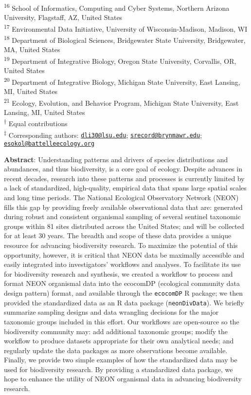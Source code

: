 \documentclass[
  12pt,
]{article}
\begin{document}
\textsuperscript{16} School of Informatics, Computing and Cyber Systems, Northern Arizona University, Flagstaff, AZ, United States\\
\textsuperscript{17} Environmental Data Initiative, University of Wisconsin-Madison, Madison, WI\\
\textsuperscript{18} Department of Biological Sciences, Bridgewater State University, Bridgewater, MA, United States\\
\textsuperscript{19} Department of Integrative Biology, Oregon State University, Corvallis, OR, United States\\
\textsuperscript{20} Department of Integrative Biology, Michigan State University, East Lansing, MI, United States\\
\textsuperscript{21} Ecology, Evolution, and Behavior Program, Michigan State University, East Lansing, MI, United States\\
\textsuperscript{†} Equal contributions\\
\textsuperscript{‡} Corresponding authors: \href{mailto:dli30@lsu.edu}{\nolinkurl{dli30@lsu.edu}}; \href{mailto:srecord@brynmawr.edu}{\nolinkurl{srecord@brynmawr.edu}}; \href{mailto:esokol@battelleecology.org}{\nolinkurl{esokol@battelleecology.org}}

\normalsize

\textbf{Abstract}: Understanding patterns and drivers of species distributions and abundances, and thus biodiversity, is a core goal of ecology. Despite advances in recent decades, research into these patterns and processes is currently limited by a lack of standardized, high-quality, empirical data that spans large spatial scales and long time periods. The National Ecological Observatory Network (NEON) fills this gap by providing freely available observational data that are: generated during robust and consistent organismal sampling of several sentinel taxonomic groups within 81 sites distributed across the United States; and will be collected for at least 30 years. The breadth and scope of these data provides a unique resource for advancing biodiversity research. To maximize the potential of this opportunity, however, it is critical that NEON data be maximally accessible and easily integrated into investigators' workflows and analyses. To facilitate its use for biodiversity research and synthesis, we created a workflow to process and format NEON organismal data into the ecocomDP (ecological community data design pattern) format, and available through the \texttt{ecocomDP} R package; we then provided the standardized data as an R data package (\texttt{neonDivData}). We briefly summarize sampling designs and data wrangling decisions for the major taxonomic groups included in this effort. Our workflows are open-source so the biodiversity community may: add additional taxonomic groups; modify the workflow to produce datasets appropriate for their own analytical needs; and regularly update the data packages as more observations become available. Finally, we provide two simple examples of how the standardized data may be used for biodiversity research. By providing a standardized data package, we hope to enhance the utility of NEON organismal data in advancing biodiversity research.
\end{document}
